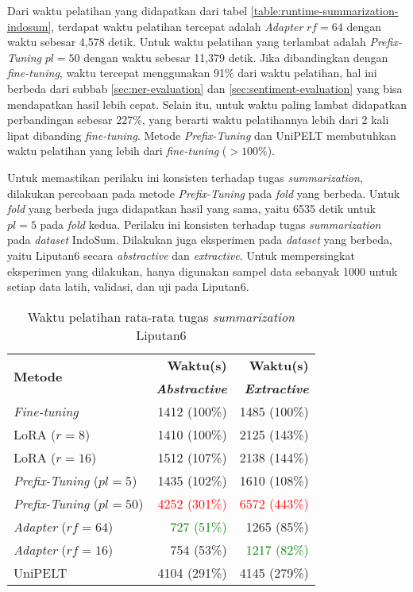 Dari waktu pelatihan yang didapatkan dari tabel \ref{table:runtime-summarization-indosum}, terdapat waktu pelatihan tercepat adalah \textit{Adapter} $rf=64$ dengan waktu sebesar 4,578 detik. Untuk waktu pelatihan yang terlambat adalah \textit{Prefix-Tuning} $pl=50$ dengan waktu sebesar 11,379 detik. Jika dibandingkan dengan \textit{fine-tuning}, waktu tercepat menggunakan 91\% dari waktu pelatihan, hal ini berbeda dari subbab \ref{sec:ner-evaluation} dan \ref{sec:sentiment-evaluation} yang bisa mendapatkan hasil lebih cepat. Selain itu, untuk waktu paling lambat didapatkan perbandingan sebesar 227\%, yang berarti waktu pelatihannya lebih dari 2 kali lipat dibanding \textit{fine-tuning}. Metode \textit{Prefix-Tuning} dan UniPELT membutuhkan waktu pelatihan yang lebih dari \textit{fine-tuning} ($>100\%$). 

Untuk memastikan perilaku ini konsisten terhadap tugas \textit{summarization}, dilakukan percobaan pada metode \textit{Prefix-Tuning} pada \textit{fold} yang berbeda. Untuk \textit{fold} yang berbeda juga didapatkan hasil yang sama, yaitu 6535 detik untuk $pl=5$ pada \textit{fold} kedua. Perilaku ini konsisten terhadap tugas \textit{summarization} pada \textit{dataset} IndoSum. Dilakukan juga eksperimen pada \textit{dataset} yang berbeda, yaitu Liputan6 secara \textit{abstractive} dan \textit{extractive}. Untuk mempersingkat eksperimen yang dilakukan, hanya digunakan sampel data sebanyak 1000 untuk setiap data latih, validasi, dan uji pada Liputan6.

\begin{table}[h]
    \centering
    \caption{Waktu pelatihan rata-rata tugas \textit{summarization} Liputan6}
    \label{table:runtime-summarization-liputan6}
    \begin{tabular}{l|r|r}
        \toprule
        \multirow{2}{*}{\textbf{Metode}} & \textbf{Waktu(s)}  & \textbf{Waktu(s)}  \\
                                         & \textbf{\textit{Abstractive}} & \textbf{\textit{Extractive}} \\
        \midrule
        \textit{Fine-tuning} & 1412 (100\%) & 1485 (100\%) \\
        LoRA ($r=8$) & 1410 (100\%) & 2125 (143\%) \\
        LoRA ($r=16$) & 1512 (107\%) & 2138 (144\%) \\
        \textit{Prefix-Tuning} ($pl=5$) & 1435 (102\%) & 1610 (108\%) \\
        \textit{Prefix-Tuning} ($pl=50$) & \textcolor{Red}{4252 (301\%)} & \textcolor{Red}{6572 (443\%)} \\
        \textit{Adapter} ($rf=64$) & \textcolor{Green}{727 (51\%)} & 1265 (85\%) \\
        \textit{Adapter} ($rf=16$) & 754 (53\%) & \textcolor{Green}{1217 (82\%)} \\
        UniPELT & 4104 (291\%) & 4145 (279\%) \\
        \bottomrule
    \end{tabular}
\end{table}

